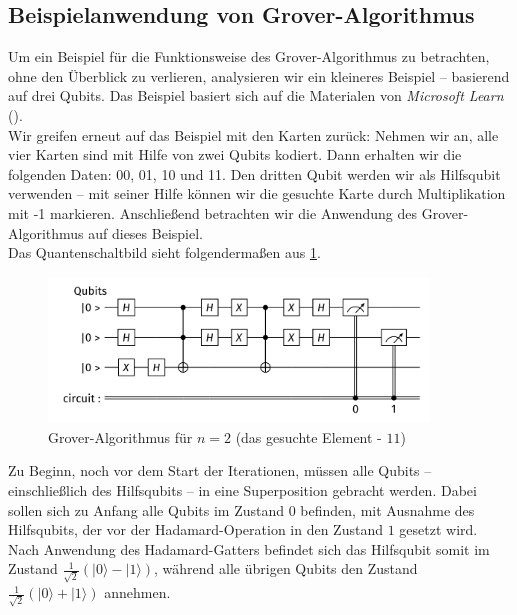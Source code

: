 \subsection{Beispielanwendung von Grover-Algorithmus}

Um ein Beispiel für die Funktionsweise des Grover-Algorithmus zu betrachten, ohne den Überblick zu verlieren, analysieren wir ein kleineres Beispiel – basierend auf drei Qubits. Das Beispiel basiert sich auf die Materialen von \textit{Microsoft Learn
}(\cite{noauthor_theory_2025}).\\ 

Wir greifen erneut auf das Beispiel mit den Karten zurück: Nehmen wir an, alle vier Karten sind mit Hilfe von zwei Qubits kodiert. Dann erhalten wir die folgenden Daten: 00, 01, 10 und 11. Den dritten Qubit werden wir als Hilfsqubit  verwenden – mit seiner Hilfe können wir die gesuchte Karte durch Multiplikation mit -1 markieren. Anschließend betrachten wir die Anwendung des Grover-Algorithmus auf dieses Beispiel.\\

Das Quantenschaltbild sieht folgendermaßen aus \ref{fig:grover-three-bits}.
\begin{figure}[h!]
    \centering
    \includegraphics[width=0.9\textwidth]{images/basic-algorithms/3-qubits-grover.png}
    \caption{Grover-Algorithmus für $n=2$ (das gesuchte Element - $11$)}
    \label{fig:grover-three-bits}
\end{figure}

Zu Beginn, noch vor dem Start der Iterationen, müssen alle Qubits – einschließlich des Hilfsqubits – in eine Superposition gebracht werden. Dabei sollen sich zu Anfang alle Qubits im Zustand $0$ befinden, mit Ausnahme des Hilfsqubits, der vor der Hadamard-Operation in den Zustand $1$ gesetzt wird.\\

Nach Anwendung des Hadamard-Gatters befindet sich das Hilfsqubit somit im Zustand $\frac{1}{\sqrt{2}}(|0\rangle - |1\rangle)$, während alle übrigen Qubits den Zustand $\frac{1}{\sqrt{2}}(|0\rangle + |1\rangle)$ annehmen.


